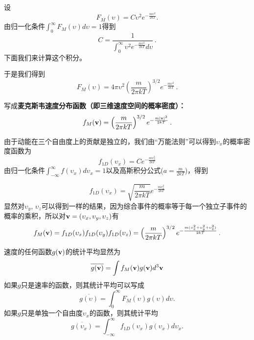 \documentclass[CJK]{beamer}
\begin{document}
\begin{frame}
\bch
设
$$F_M(\upsilon) = C \upsilon^2 e^{-\frac{m\upsilon^2}{2kT}}.$$
由归一化条件$\int_0^\infty F_M(\upsilon)d\upsilon = 1$得到
$$ C = \frac{1}{\int_0^\infty \upsilon^2 e^{-\frac{m\upsilon^2}{2kT}}d\upsilon} \, . $$
下面我们来计算这个积分。
\ech
\end{frame}


\begin{frame}
\bch
{\small
于是我们得到
$$F_M(\upsilon) = 4\pi \upsilon^2 \left(\frac{m}{2\pi kT}\right)^{3/2} e^{-\frac{m\upsilon^2}{2kT}}\,.$$

写成{\bf \blue 麦克斯韦速度分布函数（即三维速度空间的概率密度）：
$$f_M({\mathbf{v}}) = \left(\frac{m}{2\pi kT}\right)^{3/2} e^{-\frac{m|{\mathbf{v}}|^2}{2kT}}\, .$$}
}
\ech
\end{frame}

\begin{frame}
\bch
{\small
由于动能在三个自由度上的贡献是独立的，我们由“万能法则”可以得到$\upsilon_x$的概率密度函数为
$$ f_{1D}(\upsilon_x) =  C e^{-\frac{m\upsilon_x^2}{2kT}}$$
由归一化条件$\int_{-\infty}^\infty f(\upsilon_x)d\upsilon_x = 1$以及高斯积分公式($a = \frac{m}{2kT}$)，得到

$$ f_{1D}(\upsilon_x) =   \sqrt{\frac{m}{2\pi kT}} e^{-\frac{m\upsilon_x^2}{2kT}}$$
显然对$\upsilon_y$, $\upsilon_z$可以得到一样的结果，因为综合事件的概率等于每一个独立子事件的概率的乘积，所以对${\mathbf{v}} = (\upsilon_x, \upsilon_y, \upsilon_z)$有
$$f_M({\mathbf{v}}) = f_{1D}(\upsilon_x)f_{1D}(\upsilon_y)f_{1D}(\upsilon_z)=  \left(\frac{m}{2\pi kT}\right)^{3/2} e^{-\frac{m(\upsilon_x^2+\upsilon_y^2+\upsilon_z^2)}{2kT}}   \, .$$
}
\ech
\end{frame}

\begin{frame}
\bch
速度的任何函数$g({\mathbf{v}})$的统计平均显然为
{\blue $$\overline{g({\mathbf{v}})} = \int f_M({\mathbf{v}}) g({\mathbf{v}}) d^3{\mathbf{v}}$$}
如果$g$只是速率的函数，则其统计平均可以写成
{\blue $$\overline{g(\upsilon)} = \int_0^{\infty} F_M(\upsilon) g(\upsilon)d\upsilon.$$}
如果$g$只是单独一个自由度$\upsilon_x$的函数，则其统计平均
{\blue $$\overline{g(\upsilon_x)} = \int_{-\infty}^{\infty} f_{1D}(\upsilon_x) g(\upsilon_x)d\upsilon_x.$$}

\ech
\end{frame}
\end{document}
